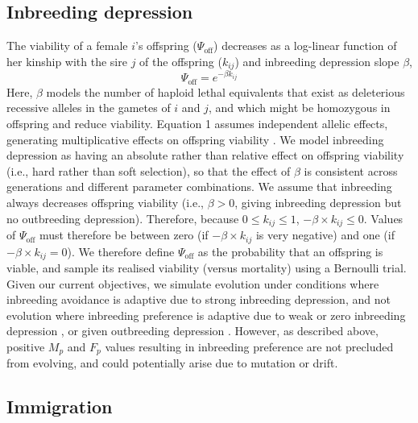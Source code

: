 \documentclass[10pt,letterpaper]{article}
\begin{document}
\subsection*{Inbreeding depression}

The viability of a female $i$'s offspring ($\Psi_{\textrm{off}}$) decreases as a log-linear function of her kinship with the sire $j$ of the offspring ($k_{ij}$) and inbreeding depression slope $\beta$,
\begin{equation}
\Psi_{\textrm{off}} = e^{-\beta k_{ij}}
\end{equation}
Here, $\beta$ models the number of haploid lethal equivalents that exist as deleterious recessive alleles in the gametes of $i$ and $j$, and which might be homozygous in offspring and reduce viability. Equation 1 assumes independent allelic effects, generating multiplicative effects on offspring viability \cite[][]{Morton1956, Mills1994}. We model inbreeding depression as having an absolute rather than relative effect on offspring viability (i.e., hard rather than soft selection), so that the effect of $\beta$ is consistent across generations and different parameter combinations. We assume that inbreeding always decreases offspring viability (i.e., $\beta > 0$, giving inbreeding depression but no outbreeding depression). Therefore, because $0 \leq k_{ij} \leq 1$, $-\beta \times k_{ij} \leq 0$. Values of $\Psi_{\textrm{off}}$ must therefore be between zero (if $-\beta \times k_{ij}$ is very negative) and one (if $-\beta \times k_{ij} = 0$). We therefore define $\Psi_{\textrm{off}}$ as the probability that an offspring is viable, and sample its realised viability (versus mortality) using a Bernoulli trial. Given our current objectives, we simulate evolution under conditions where inbreeding avoidance is adaptive due to strong inbreeding depression, and not evolution where inbreeding preference is adaptive due to weak or zero inbreeding depression \cite[][]{Parker1979, Kokko2006, Duthie2016a}, or given outbreeding depression \cite[][]{Bateson1983, Greeff2009}. However, as described above, positive $M_{p}$ and $F_{p}$ values resulting in inbreeding preference are not precluded from evolving, and could potentially arise due to mutation or drift.

\subsection*{Immigration}
\end{document}
